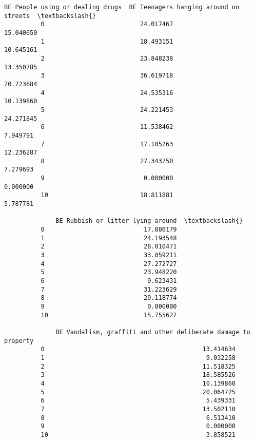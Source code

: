 \documentclass[11pt]{article}
\begin{document}
\begin{Verbatim}[commandchars=\\\{\}]
              BE People using or dealing drugs  BE Teenagers hanging around on streets  \textbackslash{}
          0                          24.017467                               15.040650   
          1                          18.493151                               10.645161   
          2                          23.848238                               13.350785   
          3                          36.619718                               20.723684   
          4                          24.535316                               10.139860   
          5                          24.221453                               24.271845   
          6                          11.538462                                7.949791   
          7                          17.105263                               12.236287   
          8                          27.343750                                7.279693   
          9                           0.000000                                0.000000   
          10                         18.811881                                5.787781   
          
              BE Rubbish or litter lying around  \textbackslash{}
          0                           17.886179   
          1                           24.193548   
          2                           28.010471   
          3                           33.059211   
          4                           27.272727   
          5                           23.948220   
          6                            9.623431   
          7                           31.223629   
          8                           29.118774   
          9                            0.000000   
          10                          15.755627   
          
              BE Vandalism, graffiti and other deliberate damage to property  
          0                                           13.414634               
          1                                            9.032258               
          2                                           11.518325               
          3                                           18.585526               
          4                                           10.139860               
          5                                           20.064725               
          6                                            5.439331               
          7                                           13.502110               
          8                                            6.513410               
          9                                            0.000000               
          10                                           3.858521               
\end{Verbatim}
            
\end{document}
